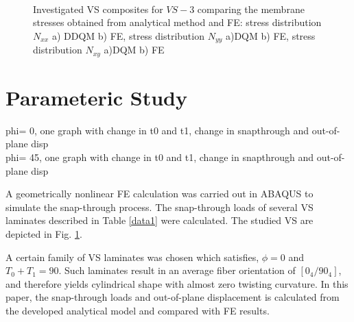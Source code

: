 \documentclass[journal]{new-aiaa}
\begin{document}
\begin{figure}[!htb]
{		\label{fig:wdispd_cs1}
	}
\\
	\hspace{0.2 cm}

	\caption{Investigated VS composites for $VS-3$ comparing the membrane stresses obtained from analytical method and FE: stress distribution $N_{xx}$ a) DDQM b) FE, stress distribution $N_{yy}$ a)DQM b) FE, stress distribution $N_{xy}$ a)DQM b) FE  }
	\label{fig:fiberpaths}
\end{figure}

\section{Parameteric Study}
phi= 0, one graph with change in t0 and t1, change in snapthrough and out-of-plane disp
\\
phi= 45, one graph with change in t0 and t1, change in snapthrough and out-of-plane disp

A geometrically nonlinear FE calculation was carried out in ABAQUS to simulate the snap-through process. The snap-through loads of several VS laminates described in Table \ref{data1} were calculated. The studied VS are depicted in Fig. \ref{fig:fiberpaths}. 


A certain family of VS laminates was chosen which satisfies, $\phi=0$ and $T_0+T_1=90$. Such laminates result in an average fiber orientation of  $[0_4/90_4]$, and therefore yields cylindrical shape with almost zero twisting curvature. In this paper, the snap-through loads and out-of-plane displacement is calculated from the developed analytical model and compared with FE results.  
\end{document}
